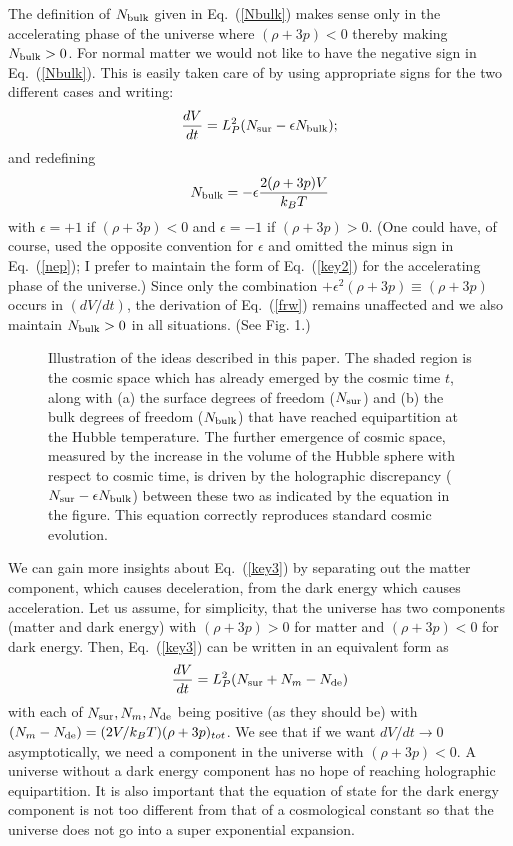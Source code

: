 \documentclass[aps,prd,showpacs,nofootinbib,floats,floatfix,preprintnumbers,groupedaddress,twocolumn]{revtex4}
\def\eq#1{{Eq.~(\ref{#1})}}
\begin{document}
The definition of $N_{\rm bulk}$ given in \eq{Nbulk} makes sense only in the accelerating phase of the universe where $(\rho + 3p) <0$ thereby making $N_{\rm bulk}>0$. For normal matter we would not like to have the negative sign in \eq{Nbulk}. This is easily taken care of by using appropriate signs for the two different cases and writing: 
\begin{equation}
 \frac{dV}{dt} = L_P^2 (N_{\rm sur} -\epsilon N_{\rm bulk}); 
\label{key3}
\end{equation} 
and redefining
\begin{equation}
 N_{\rm bulk} = -\epsilon \frac{2(\rho +3p)V}{k_BT} 
\label{nep}
\end{equation} 
with $\epsilon = +1$ if $(\rho + 3p )<0$ and $\epsilon = -1$ if $(\rho + 3p ) >0$. (One could have, of course, used the opposite convention for $\epsilon$ and omitted the minus sign in \eq{nep}; I prefer to maintain the form of \eq{key2} for the accelerating phase of the universe.)
Since only the combination $+\epsilon^2 (\rho+3p)\equiv (\rho+3p)$ occurs in $(dV/dt)$, the derivation of \eq{frw} remains unaffected and we also  maintain $N_{\rm bulk}>0$ in all situations.
 (See Fig. 1.)

\begin{figure}
\label{fig:dof}
\begin{center}
 \scalebox{0.31}{}
\caption{Illustration of the ideas described in this paper. The shaded region is the cosmic space which has already emerged by the cosmic time $t$, along with (a) the surface degrees of freedom ($N_{\rm sur}$) and (b) the bulk degrees of freedom ($N_{\rm bulk}$) that have reached equipartition at the Hubble temperature. The further emergence of cosmic space, measured by the increase in the volume of the Hubble sphere with respect to cosmic time, is driven by the holographic discrepancy ($N_{\rm sur} - \epsilon N_{\rm bulk}$) between these two as indicated by the   equation in the figure. This equation correctly reproduces standard cosmic evolution.}
\end{center}
\end{figure}

We can gain more insights about \eq{key3} by 
separating out the matter component, which causes deceleration, from the dark energy which causes acceleration.
Let us assume, for simplicity, that the universe has two components (matter and dark energy) with $(\rho + 3p)>0$ for matter and $(\rho + 3p)<0$ for  dark energy. Then, \eq{key3} can be written in an equivalent form as
\begin{equation}
 \frac{dV}{dt} = L_P^2 (N_{\rm sur} + N_m - N_{\rm de})
\label{key4}
\end{equation} 
with each of  $N_{\rm sur}, N_m, N_{\rm de}$ being positive (as they should be) with $(N_m - N_{\rm de})=(2V/k_BT)(\rho+3p)_{tot}$.
 We see that if we want $dV/dt \to 0$ asymptotically, we need a component in the universe  with $(\rho + 3p )<0$. A universe without a dark energy component  has no hope of reaching holographic equipartition.  It is also important that the equation of state for the dark energy component is not too  different from that of a cosmological constant so that the universe does not go into a super exponential expansion. 
\end{document}
